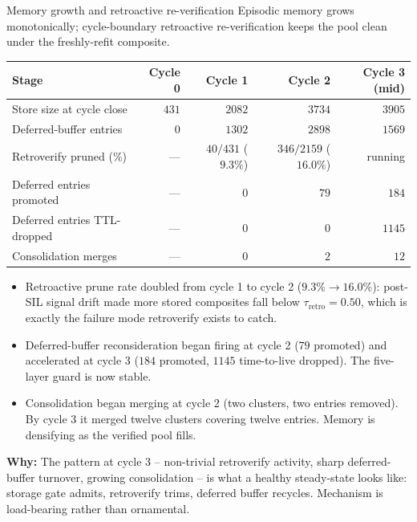 \documentclass[10pt,aspectratio=169]{beamer}
\newcommand{\why}[1]{{\color{caemamber}\textbf{Why:}} #1}
\begin{document}
\begin{frame}{Memory growth and retroactive re-verification}
  \scriptsize
  Episodic memory grows monotonically; cycle-boundary retroactive re-verification keeps the pool clean under the freshly-refit composite.

  \vspace{0.3em}
  \begin{tabular}{@{}lrrrr@{}}
    \toprule
    \textbf{Stage} & \textbf{Cycle 0} & \textbf{Cycle 1} & \textbf{Cycle 2} & \textbf{Cycle 3 (mid)} \\
    \midrule
    Store size at cycle close            & $431$  & $2082$ & $3734$ & $3905$ \\
    Deferred-buffer entries              & $0$    & $1302$ & $2898$ & $1569$ \\
    Retroverify pruned (\%)              & ---    & $40 / 431$ ($9.3\%$) & $346 / 2159$ ($16.0\%$) & running \\
    Deferred entries promoted            & ---    & $0$    & $79$   & $184$ \\
    Deferred entries TTL-dropped         & ---    & $0$    & $0$    & $1145$ \\
    Consolidation merges                 & ---    & $0$    & $2$    & $12$ \\
    \bottomrule
  \end{tabular}

  \vspace{0.4em}
  \begin{itemize}\scriptsize
    \item Retroactive prune rate doubled from cycle 1 to cycle 2 ($9.3\% \to 16.0\%$): post-SIL signal drift made more stored composites fall below $\tau_{\text{retro}}=0.50$, which is exactly the failure mode retroverify exists to catch.
    \item Deferred-buffer reconsideration began firing at cycle 2 ($79$ promoted) and accelerated at cycle 3 ($184$ promoted, $1145$ time-to-live dropped). The five-layer guard is now stable.
    \item Consolidation began merging at cycle 2 (two clusters, two entries removed). By cycle 3 it merged twelve clusters covering twelve entries. Memory is densifying as the verified pool fills.
  \end{itemize}

  \why{The pattern at cycle 3 -- non-trivial retroverify activity, sharp deferred-buffer turnover, growing consolidation -- is what a healthy steady-state looks like: storage gate admits, retroverify trims, deferred buffer recycles. Mechanism is load-bearing rather than ornamental.}
\end{frame}
\end{document}
